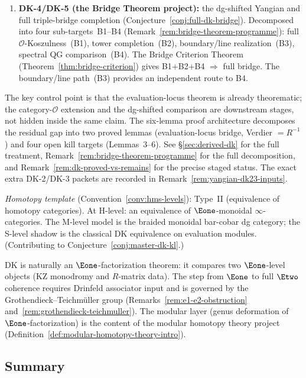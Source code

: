 \begin{remark}
\begin{enumerate}[label=\textup{(\alph*)}]
  completed/coderived extension beyond the generated core
  (Corollary~\ref{cor:dk-partial-conj}).
\item \textbf{DK-4/DK-5 (the Bridge Theorem project):} the dg-shifted Yangian and
  full triple-bridge completion
  (Conjecture~\ref{conj:full-dk-bridge}).
  Decomposed into four sub-targets~B1--B4
  (Remark~\ref{rem:bridge-theorem-programme}):
  full $\mathcal{O}$-Koszulness~(B1),
  tower completion~(B2),
  boundary/line realization~(B3),
  spectral QG comparison~(B4).
  The Bridge Criterion Theorem
  (Theorem~\ref{thm:bridge-criterion}) gives
  B1$+$B2$+$B4 $\Rightarrow$ full bridge.
  The boundary/line path~(B3) provides an independent route to B4.
\end{enumerate}
The key control point is that the evaluation-locus theorem is already
theorematic; the category-$\mathcal{O}$ extension and the dg-shifted
comparison are downstream stages, not hidden inside the same claim.
The six-lemma proof architecture decomposes the residual gap into
two proved lemmas (evaluation-locus bridge, Verdier $= R^{-1}$) and
four open kill targets (Lemmas~3--6).
See \S\ref{sec:derived-dk} for the full treatment,
Remark~\ref{rem:bridge-theorem-programme} for the full decomposition,
and Remark~\ref{rem:dk-proved-vs-remains} for the precise staged
status.
The exact extra DK-2/DK-3 packets are recorded in
Remark~\ref{rem:yangian-dk23-inputs}.

\emph{Homotopy template} (Convention~\ref{conv:hms-levels}): Type~II
(equivalence of homotopy categories).  At H-level: an equivalence of
$\Eone$-monoidal $\infty$-categories.  The M-level model is the braided
monoidal bar-cobar dg category; the S-level shadow is the classical DK
equivalence on evaluation modules.
(Contributing to Conjecture~\ref{conj:master-dk-kl}.)

DK is naturally an $\Eone$-factorization theorem: it compares two
$\Eone$-level objects (KZ monodromy and $R$-matrix data).  The step
from $\Eone$ to full $\Etwo$ coherence requires Drinfeld associator
input and is governed by the Grothendieck--Teichm\"uller group
(Remarks~\ref{rem:e1-e2-obstruction}
and~\ref{rem:grothendieck-teichmuller}).  The modular layer (genus
deformation of $\Eone$-factorization) is the content of the modular
homotopy theory project
(Definition~\ref{def:modular-homotopy-theory-intro}).
\end{remark}

\subsection{Summary}

